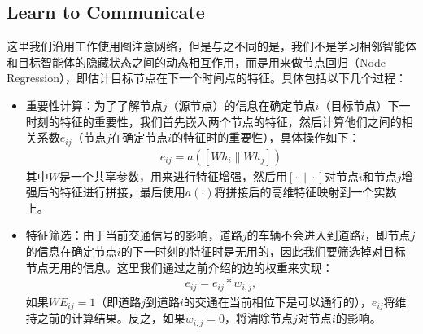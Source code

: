 \subsection{Learn to Communicate}
这里我们沿用工作使用图注意网络，但是与之不同的是，我们不是学习相邻智能体和目标智能体的隐藏状态之间的动态相互作用，而是用来做节点回归（Node Regression），即估计目标节点在下一个时间点的特征。具体包括以下几个过程：
\begin{itemize}
  \item 重要性计算：为了了解节点$j$（源节点）的信息在确定节点$i$（目标节点）下一时刻的特征的重要性，我们首先嵌入两个节点的特征，然后计算他们之间的相关系数$e_{i j}$（节点$j$在确定节点$i$的特征时的重要性），具体操作如下：
  \begin{align}
    e_{i j}=a\left(\left[W h_{i} \| W h_{j}\right]\right)
  \end{align}
  其中$W$是一个共享参数，用来进行特征增强，然后用$[\cdot \| \cdot]$对节点$i$和节点$j$增强后的特征进行拼接，最后使用$a(\cdot)$将拼接后的高维特征映射到一个实数上。
  
  \item 特征筛选：由于当前交通信号的影响，道路$j$的车辆不会进入到道路$i$，即节点$j$的信息在确定节点$i$的下一时刻的特征时是无用的，因此我们要筛选掉对目标节点无用的信息。这里我们通过之前介绍的边的权重来实现：
  \begin{align}
    \label{eq:mul_phase}
    e_{i j} = e_{i j} * w_{i,j},
  \end{align}
  如果$WE_{i j} = 1$（即道路$j$到道路$i$的交通在当前相位下是可以通行的），$e_{ij}$将维持之前的计算结果。反之，如果$w_{i,j}=0$，将清除节点$j$对节点$i$的影响。
  

\end{itemize}
